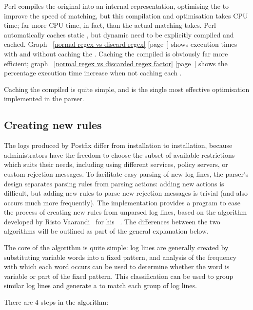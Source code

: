 \documentclass[a4paper,12pt,draft]{article}
\newcommand{\refwithpage}[1]{%
    \empty{}\ref{#1} [page~\pageref{#1}]%
}
\begin{document}
\label{Caching each regex}

Perl compiles the original \regex{} into an internal representation,
optimising the \regex{} to improve the speed of matching, but this
compilation and optimisation takes CPU time; far more CPU time, in fact,
than the actual matching takes.  Perl automatically caches static
\regexes{}, but dynamic \regexes{} need to be explicitly compiled and
cached.  Graph~\refwithpage{normal regex vs discard regex} shows execution
times with and without caching the \regex{}.  Caching the compiled
\regexes{} is obviously far more efficient; graph~\refwithpage{normal regex
vs discarded regex factor} shows the percentage execution time increase
when not caching each \regex{}.

Caching the compiled \regexes{} is quite simple, and is the single most
effective optimisation implemented in the parser.

\subsection{Creating new rules}

\label{creating new rules}

The logs produced by Postfix differ from installation to installation,
because administrators have the freedom to choose the subset of available
restrictions which suits their needs, including using different \RBL{}
services, policy servers, or custom rejection messages.  To facilitate easy
parsing of new log lines, the parser's design separates parsing rules from
parsing actions: adding new actions is difficult, but adding new rules to
parse new rejection messages is trivial (and also occurs much more
frequently).  The implementation provides a program to ease the process of
creating new rules from unparsed log lines, based on the algorithm
developed by Risto Vaarandi~\cite{risto-vaarandi} for his
\SLCT{}~\cite{slct-paper}.  The differences between the two algorithms will
be outlined as part of the general explanation below.

The core of the algorithm is quite simple: log lines are generally created
by substituting variable words into a fixed pattern, and analysis of the
frequency with which each word occurs can be used to determine whether the
word is variable or part of the fixed pattern.  This classification can be
used to group similar log lines and generate a \regex{} to match each group
of log lines.

There are 4 steps in the algorithm:
\end{document}
